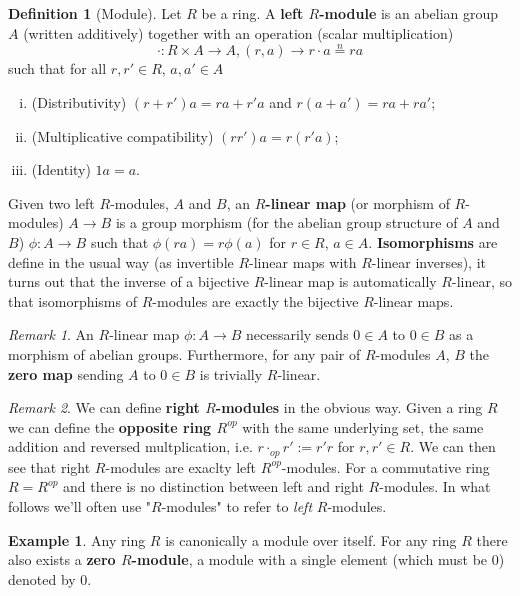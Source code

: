 \documentclass[a4paper,12pt,parskip=half*,chapterprefix=true,numbers=noendperiod]{scrreprt}
\theoremstyle{definition}
\newtheorem{definition}{Definition}[section]
\newtheorem{example}{Example}[section]
\theoremstyle{remark}
\newtheorem*{remark}{Remark}
\begin{document}
\begin{definition}[Module]
	Let $R$ be a ring. A \textbf{left $R$-module} is an abelian group $A$ (written additively) together with an operation (scalar multiplication)
	\begin{equation*}
		\cdot:R\times A\to A,(r,a)\to r\cdot a\overset{n}{=}ra
	\end{equation*}
	such that for all $r,r'\in R$, $a,a'\in A$
	\begin{enumerate}[(i)]
		\item (Distributivity) $(r+r')a=ra+r'a$ and $r(a+a')=ra+ra'$;
		\item (Multiplicative compatibility) $(rr')a=r(r'a)$;
		\item (Identity) $1a=a$.
	\end{enumerate}
	
	Given two left $R$-modules, $A$ and $B$, an \textbf{$R$-linear map} (or morphism of $R$-modules) $A\to B$ is a group morphism (for the abelian group structure of $A$ and $B$) $\phi:A\to B$ such that $\phi(ra)=r\phi(a)$ for $r\in R$, $a\in A$. \textbf{Isomorphisms} are define in the usual way (as invertible $R$-linear maps with $R$-linear inverses), it turns out that the inverse of a bijective $R$-linear map is automatically $R$-linear, so that isomorphisms of $R$-modules are exactly the bijective $R$-linear maps.
\end{definition}
\begin{remark}
	An $R$-linear map $\phi:A\to B$ necessarily sends $0\in A$ to $0\in B$ as a morphism of abelian groups. Furthermore, for any pair of $R$-modules $A$, $B$ the \textbf{zero map} sending $A$ to $0\in B$ is trivially $R$-linear.
\end{remark}
\begin{remark}
	We can define \textbf{right $R$-modules} in the obvious way. Given a ring $R$ we can define the \textbf{opposite ring $R^{op}$} with the same underlying set, the same addition and reversed multplication, i.e. $r\cdot_{op}r':=r'r$ for $r,r'\in R$. We can then see that right $R$-modules are exaclty left $R^{op}$-modules. For a commutative ring $R=R^{op}$ and there is no distinction between left and right $R$-modules. In what follows we'll often use "$R$-modules" to refer to \emph{left} $R$-modules.
\end{remark}
\begin{example}
	Any ring $R$ is canonically a module over itself. For any ring $R$ there also exists a \textbf{zero $R$-module}, a module with a single element (which must be $0$) denoted by $0$.
\end{example}
\end{document}
